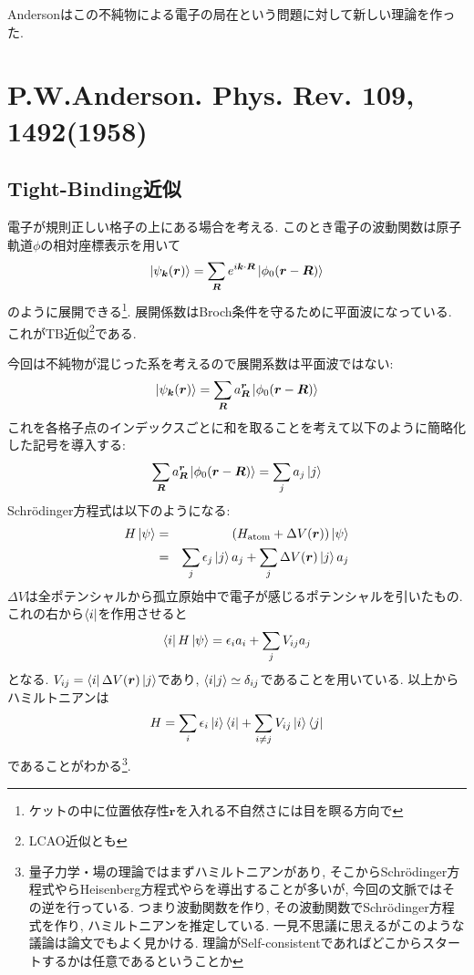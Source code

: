 \documentclass[10.5pt,a4paper]{jreport}
\begin{document}
Andersonはこの不純物による電子の局在という問題に対して新しい理論を作った.
\section{P.W.Anderson. Phys. Rev. $\bm{109}$, 1492(1958)}
\subsection{Tight-Binding近似}
電子が規則正しい格子の上にある場合を考える. このとき電子の波動関数は原子軌道$\phi$の相対座標表示を用いて
\begin{eqnarray}
  \ket{\psi_{\bm{k}}(\bm{r})} = \sum_{\bm{R}}e^{i\bm{k}\cdot\bm{R}}\ket{\phi_0(\bm{r}-\bm{R})}
\end{eqnarray}
のように展開できる\footnote{ケットの中に位置依存性$\bm{r}$を入れる不自然さには目を瞑る方向で}. 展開係数はBroch条件を守るために平面波になっている. これがTB近似\footnote{LCAO近似とも}である.

今回は不純物が混じった系を考えるので展開系数は平面波ではない:
\begin{eqnarray}
  \ket{\psi_{\bm{k}}(\bm{r})} = \sum_{\bm{R}}a_{\bm R}^{\bm r}\ket{\phi_0(\bm{r}-\bm{R})}
\end{eqnarray}
これを各格子点のインデックスごとに和を取ることを考えて以下のように簡略化した記号を導入する:
\begin{eqnarray}
  \sum_{\bm{R}}a_{\bm R}^{\bm r}\ket{\phi_0(\bm{r}-\bm{R})} = \sum_ja_j\ket{j}
\end{eqnarray}
Schr\"odinger方程式は以下のようになる:
\begin{eqnarray}
  H\ket{\psi} &=& \qty(H_{\rm atom} + \Delta V(\bm{r}))\ket{\psi}\\
  &=&\sum_j\epsilon_j\ket{j}a_j + \sum_j\Delta V(\bm{r})\ket{j}a_j
\end{eqnarray}
$\Delta V$は全ポテンシャルから孤立原始中で電子が感じるポテンシャルを引いたもの. これの右から$\bra{i}$を作用させると
\begin{eqnarray}
  \bra{i}H\ket{\psi} = \epsilon_ia_i + \sum_jV_{ij}a_j
\end{eqnarray}
となる. $V_{ij} = \bra{i}\Delta V({\bm r})\ket{j}$であり, $\bra{i}\ket{j} \simeq \delta_{ij}$であることを用いている. 以上からハミルトニアンは
\begin{eqnarray}
  H = \sum_i\epsilon_i\ket{i}\bra{i} + \sum_{i\neq j}V_{ij}\ket{i}\bra{j}
\end{eqnarray}
であることがわかる\footnote{量子力学・場の理論ではまずハミルトニアンがあり, そこからSchr\"odinger方程式やらHeisenberg方程式やらを導出することが多いが, 今回の文脈ではその逆を行っている. つまり波動関数を作り, その波動関数でSchr\"odinger方程式を作り, ハミルトニアンを推定している. 一見不思議に思えるがこのような議論は論文でもよく見かける. 理論がSelf-consistentであればどこからスタートするかは任意であるということか}.
\end{document}
